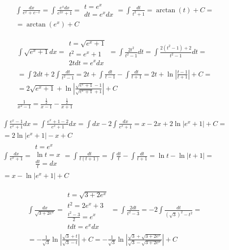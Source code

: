 
\begin{gather*}\int \frac{dx}{e^x+e^{-x}} = \int \frac{e^xdx}{e^{2x}+1} =\begin{array}{|l|}
t=e^x \\
dt=e^xdx
\end{array}= \int \frac{dt}{t^2+1} = \arctan (t)+C = \\ = \arctan (e^x)+C\end{gather*}



\begin{gather*}\int \sqrt{e^x+1}dx=\begin{array}{|l|}
t=\sqrt{e^x+1} \\
t^2=e^x+1 \\
2tdt=e^xdx
\end{array}= \int \frac{2t^2}{t^2-1}dt = \int \frac{2(t^2-1)+2}{t^2-1}dt = \\ = \int 2dt+2\int \frac{dt}{t^2-1} = 2t+\int \frac{dt}{t-1}-\int \frac{dt}{t+1} = 2t+\ln\left|\frac{t-1}{t+1}\right|+C = \\ = 2\sqrt{e^x+1}+\ln\left|\frac{\sqrt{e^x+1}-1}{\sqrt{e^x+1}+1}\right|+C \\
\nonumber \frac{1}{x^2-1}=\frac{\frac{1}{2}}{x-1}-\frac{\frac{1}{2}}{x+1}\end{gather*}



\begin{gather*}\int \frac{e^x-1}{e^x+1}dx = \int \frac{e^x+1-2}{e^x+1}dx = \int dx -2\int \frac{dx}{e^x+1} = x - 2x + 2\ln|e^x+1|+C = \\ = 2\ln|e^x+1|-x+C \\
\int \frac{dx}{e^x+1} =\begin{array}{|l|}
t=e^x \\
\ln t = x \\
\frac{dt}{t}=dx
\end{array}= \int \frac{dt}{t(t+1)} = \int \frac{dt}{t} - \int \frac{dt}{t+1} = \ln t - \ln|t+1| = \\ =x-\ln|e^x+1|+C\end{gather*}



\begin{gather*}\int \frac{dx}{\sqrt{3+2e^x}}=\begin{array}{|l|}
t=\sqrt{3+2e^x} \\
t^2=2e^x+3 \\
\frac{t^2-3}{2}=e^x \\
tdt=e^xdx
\end{array}= \int \frac{2dt}{t^2-3} = -2\int \frac{dt}{(\sqrt{3})^2-t^2} = \\ = -\frac{1}{\sqrt{3}}\ln\left|\frac{\sqrt{3}+t}{\sqrt{3}-t}\right|+C = -\frac{1}{\sqrt{3}}\ln\left|\frac{\sqrt{3}+ \sqrt{3+2e^x}}{\sqrt{3}-\sqrt{3+2e^x}}\right|+C\end{gather*}


